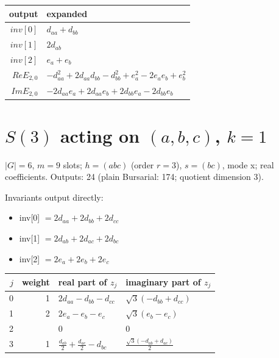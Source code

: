 \documentclass[10pt]{article}
\begin{document}
\begin{longtable}{r>{\raggedright\arraybackslash}p{}}
output & expanded \\ \hline
$inv[0]$ & $d_{aa} + d_{bb}$ \\
$inv[1]$ & $2 d_{ab}$ \\
$inv[2]$ & $e_{a} + e_{b}$ \\
$Re E_{2,0}$ & $- d_{aa}^{2} + 2 d_{aa} d_{bb} - d_{bb}^{2} + e_{a}^{2} - 2 e_{a} e_{b} + e_{b}^{2}$ \\
$Im E_{2,0}$ & $- 2 d_{aa} e_{a} + 2 d_{aa} e_{b} + 2 d_{bb} e_{a} - 2 d_{bb} e_{b}$ \\
\end{longtable}

\clearpage
\section{$S(3)$ acting on $(a, b, c)$, $k = 1$}
$|G| = 6$, $m = 9$ slots; $h = (a b c)$ (order $r = 3$), $s = (b c)$, mode x; real coefficients. Outputs: 24 (plain Bursarial: 174; quotient dimension 3).

Invariants output directly:
\begin{itemize}
  \item inv[0] $= 2 d_{aa} + 2 d_{bb} + 2 d_{cc}$
  \item inv[1] $= 2 d_{ab} + 2 d_{ac} + 2 d_{bc}$
  \item inv[2] $= 2 e_{a} + 2 e_{b} + 2 e_{c}$
\end{itemize}

\begin{longtable}{rr>{\raggedright\arraybackslash}p{}>{\raggedright\arraybackslash}p{}}
$j$ & weight & real part of $z_j$ & imaginary part of $z_j$ \\ \hline
0 & 1 & $2 d_{aa} - d_{bb} - d_{cc}$ & $\sqrt{3} \left(- d_{bb} + d_{cc}\right)$ \\
1 & 2 & $2 e_{a} - e_{b} - e_{c}$ & $\sqrt{3} \left(e_{b} - e_{c}\right)$ \\
2 &  & $0$ & $0$ \\
3 & 1 & $\frac{d_{ab}}{2} + \frac{d_{ac}}{2} - d_{bc}$ & $\frac{\sqrt{3} \left(- d_{ab} + d_{ac}\right)}{2}$ \\
\end{longtable}
\end{document}
